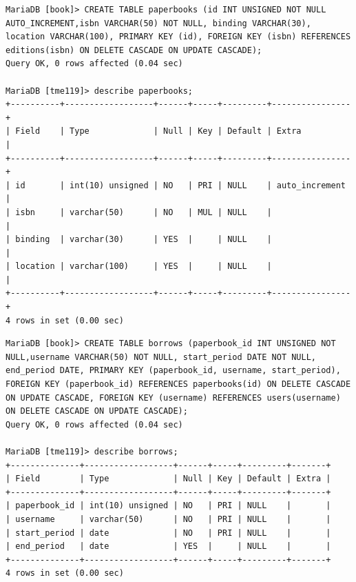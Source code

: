 \documentclass{assignment}
\begin{document}
\begin{verbatim}
MariaDB [book]> CREATE TABLE paperbooks (id INT UNSIGNED NOT NULL AUTO_INCREMENT,isbn VARCHAR(50) NOT NULL, binding VARCHAR(30), location VARCHAR(100), PRIMARY KEY (id), FOREIGN KEY (isbn) REFERENCES editions(isbn) ON DELETE CASCADE ON UPDATE CASCADE);
Query OK, 0 rows affected (0.04 sec)

MariaDB [tme119]> describe paperbooks;
+----------+------------------+------+-----+---------+----------------+
| Field    | Type             | Null | Key | Default | Extra          |
+----------+------------------+------+-----+---------+----------------+
| id       | int(10) unsigned | NO   | PRI | NULL    | auto_increment |
| isbn     | varchar(50)      | NO   | MUL | NULL    |                |
| binding  | varchar(30)      | YES  |     | NULL    |                |
| location | varchar(100)     | YES  |     | NULL    |                |
+----------+------------------+------+-----+---------+----------------+
4 rows in set (0.00 sec)
\end{verbatim}

\begin{verbatim}
MariaDB [book]> CREATE TABLE borrows (paperbook_id INT UNSIGNED NOT NULL,username VARCHAR(50) NOT NULL, start_period DATE NOT NULL, end_period DATE, PRIMARY KEY (paperbook_id, username, start_period), FOREIGN KEY (paperbook_id) REFERENCES paperbooks(id) ON DELETE CASCADE ON UPDATE CASCADE, FOREIGN KEY (username) REFERENCES users(username) ON DELETE CASCADE ON UPDATE CASCADE);
Query OK, 0 rows affected (0.04 sec)

MariaDB [tme119]> describe borrows;
+--------------+------------------+------+-----+---------+-------+
| Field        | Type             | Null | Key | Default | Extra |
+--------------+------------------+------+-----+---------+-------+
| paperbook_id | int(10) unsigned | NO   | PRI | NULL    |       |
| username     | varchar(50)      | NO   | PRI | NULL    |       |
| start_period | date             | NO   | PRI | NULL    |       |
| end_period   | date             | YES  |     | NULL    |       |
+--------------+------------------+------+-----+---------+-------+
4 rows in set (0.00 sec)

\end{verbatim}
\end{document}
